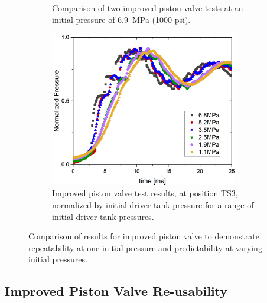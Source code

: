 \begin{figure}[htbp]
    \centering
    \begin{subfigure}[t]{0.45\textwidth}
        \centering
        \caption{Comparison of two improved piston valve tests at an initial pressure of \SI{6.9}{\mega\pascal} (1000 psi).}
        \label{fig:new piston 2 test}
    \end{subfigure}
    \hfill
    \begin{subfigure}[t]{0.45\textwidth}
        \centering
        \includegraphics[width=0.9\textwidth]{results/plots/norm_FFKM.png}
        \caption{Improved piston valve test results, at position TS3, normalized by initial driver tank pressure for a range of initial driver tank pressures.}
        \label{fig:new norm}
    \end{subfigure}
    \caption{Comparison of results for improved piston valve to demonstrate repeatability at one initial pressure and predictability at varying initial pressures.}
    \label{fig:new piston repeatability}
\end{figure}

\subsection{Improved Piston Valve Re-usability} \label{ss:new reusability}

